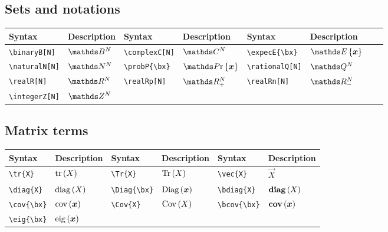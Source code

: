 \documentclass{article}
\begin{document}
	\subsection{Sets and notations}
	\begin{table}[H]
		\begin{tabular}{|l|l|l|l|l|l|l|l|}
			\hline
			Syntax	&	Description	&	Syntax	&	Description	&	Syntax	&	Description \\
			\hline
			\verb|\binaryB[N]|	&	$\binaryB[N]$	&	\verb|\complexC[N]|	&	$\complexC[N]$	&	\verb|\expecE{\bx}|	&	$\expecE{\bx}$\\
			\verb|\naturalN[N]|	&	$\naturalN[N]$	&	\verb|\probP{\bx}|	&	$\probP{\bx}$	&	\verb|\rationalQ[N]|	&	$\rationalQ[N]$\\
			\verb|\realR[N]|	&	$\realR[N]$	&	\verb|\realRp[N]|	&	$\realRp[N]$	&	\verb|\realRn[N]|	&	$\realRn[N]$\\
			\verb|\integerZ[N]|	&	$\integerZ[N]$	&		&		&		&	\\
			\hline	
		\end{tabular}
	\end{table}

	\subsection{Matrix terms}
	\begin{table}[H]
		\begin{tabular}{|l|l|l|l|l|l|}
			\hline
			Syntax	&	Description	&	Syntax	&	Description	&	Syntax	&	Description	 \\
			\hline
			\verb|\tr{X}|	&	$\mathrm{tr}\left(X\right)$	&	\verb|\Tr{X}|	&	$\mathrm{Tr}\left(X\right)$ &	\verb|\vec{X}|	&	$\vec{X}$	\\
			\verb|\diag{X}|	&	$\mathrm{diag}\left(X\right)$	&	\verb|\Diag{\bx}|	&	$\mathrm{Diag}\left(\boldsymbol{x}\right)$	&	\verb|\bdiag{X}|	&	$\mathbf{diag}\left(X\right)$	\\
			\verb|\cov{\bx}|	&	$\mathrm{cov}\left(\boldsymbol{x}\right)$ &	\verb|\Cov{X}|	&	$\mathrm{Cov}\left(X\right)$	&	\verb|\bcov{\bx}|	&	$\mathbf{cov}\left(\boldsymbol{x}\right)$	\\
			\verb|\eig{\bx}|	&	$\mathrm{eig}\left(\boldsymbol{x}\right)$ &		&		&		&\\
			\hline	
		\end{tabular}
	\end{table}
\end{document}
